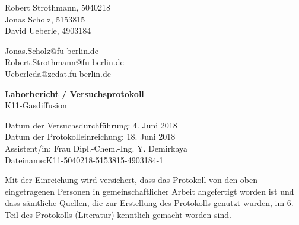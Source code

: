 
\thispagestyle{empty}

\begin{flushleft}
Robert Strothmann, 5040218\\ 
Jonas Scholz, 5153815\\ 
David Ueberle, 4903184\\ 
\end{flushleft}
\vspace*{0.3cm}
Jonas.Scholz@fu-berlin.de\\
Robert.Strothmann@fu-berlin.de\\
Ueberleda@zedat.fu-berlin.de\\
\begin{center}
	\vspace*{1cm}
	\Large
	{ \bfseries Laborbericht / Versuchsprotokoll}\\
	\vspace*{1cm}
	{K11-Gasdiffusion}\\
\end{center}
	\vspace*{1cm}
	{Datum der Versuchsdurchführung: 4. Juni 2018}\\
	{Datum der Protokolleinreichung:  18. Juni 2018}\\
	{Assistent/in: Frau Dipl.-Chem.-Ing. Y. Demirkaya}\\
	{Dateiname:K11-5040218-5153815-4903184-1}	
	\vfill
\begin{flushleft}
Mit der Einreichung wird versichert, dass das Protokoll von den oben eingetragenen Personen in gemeinschaftlicher Arbeit angefertigt worden ist und dass sämtliche Quellen, die zur Erstellung des Protokolls genutzt wurden, im 6. Teil des Protokolls (Literatur) kenntlich gemacht worden sind.
\end{flushleft}

\normalsize
\newpage
%